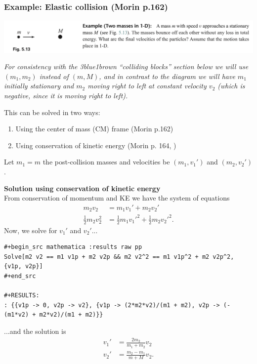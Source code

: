 \subsubsection*{Example: Elastic collision (Morin p.162)}

\begin{mdframed}
  \includegraphics[width=400pt]{img/physics--classical-mechanics--morin--sec-5-6-ex.png}
\end{mdframed}

\textit{For consistency with the 3blue1brown ``colliding blocks'' section below we will use
  $(m_1, m_2)$ instead of $(m, M)$, and in contrast to the diagram we will have $m_1$ initially
  stationary and $m_2$ moving right to left at constant velocity $v_2$ (which is negative, since it
  is moving right to left).}

This can be solved in two ways:
\begin{enumerate}
\item Using the center of mass (CM) frame (Morin p.162)
\item Using conservation of kinetic energy (Morin p. 164, )
\end{enumerate}

Let $m_1 = m$ the post-collision masses and velocities be $(m_1, v_1')$ and $(m_2, v_2')$.

{\bf Solution using conservation of kinetic energy}\\

From conservation of momentum and KE we have the system of equations
\begin{align}
  m_2v_2              &= m_1v_1' + m_2v_2' \\
  \frac{1}{2}m_2v_2^2 &= \frac{1}{2}m_1v_1'^2 + \frac{1}{2}m_2v_2'^2.
\end{align}
Now, we solve for $v_1'$ and $v_2'$...

\begin{verbatim}
#+begin_src mathematica :results raw pp
Solve[m2 v2 == m1 v1p + m2 v2p && m2 v2^2 == m1 v1p^2 + m2 v2p^2, {v1p, v2p}]
#+end_src

#+RESULTS:
: {{v1p -> 0, v2p -> v2}, {v1p -> (2*m2*v2)/(m1 + m2), v2p -> (-(m1*v2) + m2*v2)/(m1 + m2)}}
\end{verbatim}
...and the solution is
\begin{align*}
  v_1' &= \frac{2m_2}{m_1 + m_2}v_2 \\
  v_2' &= \frac{m_2 - m_1}{m + M}v_2.
\end{align*}

